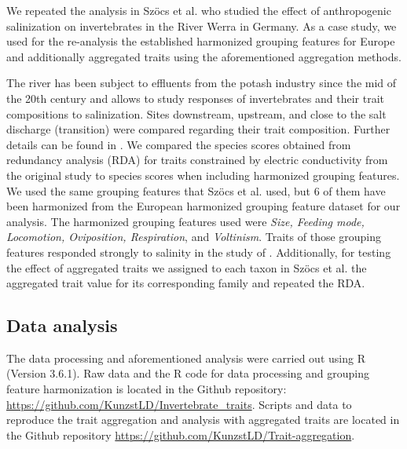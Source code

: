 \documentclass{article}
\begin{document}
We repeated the analysis in Szöcs et al. \cite{szocs_effects_2014} who studied the effect of anthropogenic salinization on invertebrates in the River Werra in Germany. As a case study, we used for the re-analysis the established harmonized grouping features for Europe and additionally aggregated traits using the aforementioned aggregation methods. 

The river has been subject to effluents from the potash industry since the mid of the 20th century and allows to study responses of invertebrates and their trait compositions to salinization. Sites downstream, upstream, and close to the salt discharge (transition) were compared regarding their trait composition. Further details can be found in \cite{szocs_effects_2014}. We compared the species scores obtained from redundancy analysis (RDA) for traits constrained by electric conductivity from the original study to species scores when including harmonized grouping features. We used the same grouping features that Szöcs et al. \cite{szocs_effects_2014} used, but 6 of them have been harmonized from the European harmonized grouping feature dataset for our analysis. The harmonized grouping features used were \textit{Size, Feeding mode, Locomotion, Oviposition, Respiration}, and \textit{Voltinism}. Traits of those grouping features responded strongly to salinity in the study of \cite{szocs_effects_2014}. Additionally, for testing the effect of aggregated traits we assigned to each taxon in Szöcs et al. \cite{szocs_effects_2014} the aggregated trait value for its corresponding family and repeated the RDA. 


\subsection*{Data analysis}

The data processing and aforementioned analysis were carried out using R (Version 3.6.1). Raw data and the R code for data processing and grouping feature harmonization is located in the Github repository: \url{https://github.com/KunzstLD/Invertebrate_traits}. Scripts and data to reproduce the trait aggregation and analysis with aggregated traits are located in the Github repository \url{https://github.com/KunzstLD/Trait-aggregation}.

\end{document}
